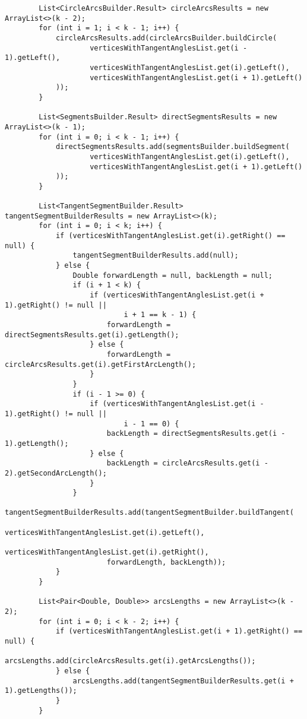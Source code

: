 \begin{verbatim}
        List<CircleArcsBuilder.Result> circleArcsResults = new ArrayList<>(k - 2);
        for (int i = 1; i < k - 1; i++) {
            circleArcsResults.add(circleArcsBuilder.buildCircle(
                    verticesWithTangentAnglesList.get(i - 1).getLeft(),
                    verticesWithTangentAnglesList.get(i).getLeft(),
                    verticesWithTangentAnglesList.get(i + 1).getLeft()
            ));
        }

        List<SegmentsBuilder.Result> directSegmentsResults = new ArrayList<>(k - 1);
        for (int i = 0; i < k - 1; i++) {
            directSegmentsResults.add(segmentsBuilder.buildSegment(
                    verticesWithTangentAnglesList.get(i).getLeft(),
                    verticesWithTangentAnglesList.get(i + 1).getLeft()
            ));
        }

        List<TangentSegmentBuilder.Result> tangentSegmentBuilderResults = new ArrayList<>(k);
        for (int i = 0; i < k; i++) {
            if (verticesWithTangentAnglesList.get(i).getRight() == null) {
                tangentSegmentBuilderResults.add(null);
            } else {
                Double forwardLength = null, backLength = null;
                if (i + 1 < k) {
                    if (verticesWithTangentAnglesList.get(i + 1).getRight() != null ||
                            i + 1 == k - 1) {
                        forwardLength = directSegmentsResults.get(i).getLength();
                    } else {
                        forwardLength = circleArcsResults.get(i).getFirstArcLength();
                    }
                }
                if (i - 1 >= 0) {
                    if (verticesWithTangentAnglesList.get(i - 1).getRight() != null ||
                            i - 1 == 0) {
                        backLength = directSegmentsResults.get(i - 1).getLength();
                    } else {
                        backLength = circleArcsResults.get(i - 2).getSecondArcLength();
                    }
                }
                tangentSegmentBuilderResults.add(tangentSegmentBuilder.buildTangent(
                        verticesWithTangentAnglesList.get(i).getLeft(),
                        verticesWithTangentAnglesList.get(i).getRight(),
                        forwardLength, backLength));
            }
        }

        List<Pair<Double, Double>> arcsLengths = new ArrayList<>(k - 2);
        for (int i = 0; i < k - 2; i++) {
            if (verticesWithTangentAnglesList.get(i + 1).getRight() == null) {
                arcsLengths.add(circleArcsResults.get(i).getArcsLengths());
            } else {
                arcsLengths.add(tangentSegmentBuilderResults.get(i + 1).getLengths());
            }
        }


\end{verbatim}

